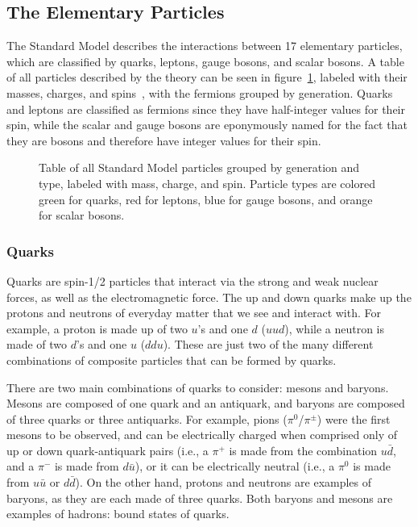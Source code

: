 \subsection{The Elementary Particles}
\label{subsec:particles}

The Standard Model describes the interactions between 17 elementary particles, which are classified by quarks, leptons, gauge bosons, and scalar bosons.
A table of all particles described by the theory can be seen in figure~\ref{fig:standardModel}, labeled with their masses, charges, and spins~\cite{PhysRevD.98.030001}, with the fermions grouped by generation.
Quarks and leptons are classified as fermions since they have half-integer values for their spin, while the scalar and gauge bosons are eponymously named for the fact that they are bosons and therefore have integer values for their spin.

\begin{figure}[htbp]
  \centering
  
  \caption{
    Table of all Standard Model particles grouped by generation and type, labeled with mass, charge, and spin.
    Particle types are colored green for quarks, red for leptons, blue for gauge bosons, and orange for scalar bosons.
  }
  \label{fig:standardModel}
\end{figure}

\subsubsection{Quarks}

Quarks are spin-1/2 particles that interact via the strong and weak nuclear forces, as well as the electromagnetic force.
The up and down quarks make up the protons and neutrons of everyday matter that we see and interact with.
For example, a proton is made up of two $u$'s and one $d$ ($uud$), while a neutron is made of two $d$'s and one $u$ ($ddu$).
These are just two of the many different combinations of composite particles that can be formed by quarks.

There are two main combinations of quarks to consider: mesons and baryons.
Mesons are composed of one quark and an antiquark, and baryons are composed of three quarks or three antiquarks.
For example, pions ($\pi^0$/$\pi^\pm$) were the first mesons to be observed, and can be electrically charged when comprised only of up or down quark-antiquark pairs (i.e., a $\pi^+$ is made from the combination $u\bar{d}$, and a $\pi^-$ is made from $d\bar{u}$), or it can be electrically neutral (i.e., a $\pi^0$ is made from $u\bar{u}$ or $d\bar{d}$).
On the other hand, protons and neutrons are examples of baryons, as they are each made of three quarks.
Both baryons and mesons are examples of hadrons: bound states of quarks.


